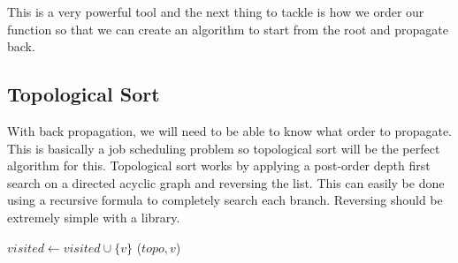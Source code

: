 This is a very powerful tool and the next thing to tackle is how we order our function 
so that we can create an algorithm to start from the root and propagate back.

\subsection{Topological Sort}

With back propagation, we will need to be able to know what order to propagate. 
This is basically a job scheduling problem so topological sort will be the perfect algorithm for this.
Topological sort works by applying a post-order depth first search on a directed acyclic graph 
and reversing the list. This can easily be done using a recursive formula to completely search each branch. Reversing should be extremely simple with a library.


\begin{algorithm}[H]
\caption{DFS for Topological Sort}
\label{alg:dfs_topo}
\begin{algorithmic}
        \State $visited \gets visited \cup \{v\}$
            \State {}
        \EndFor
        \State {}($topo, v$)
    \EndIf
\EndProcedure
\end{algorithmic}
\end{algorithm}
